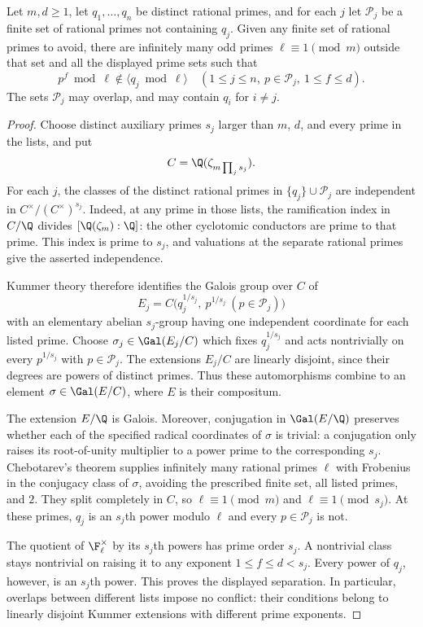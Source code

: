 \begin{lemma}\label{lem:power-separation}
Let $m,d\ge1$, let $q_1,\ldots,q_n$ be distinct rational primes, and for each $j$ let $\mathcal P_j$ be a finite set of rational primes not containing $q_j$. Given any finite set of rational primes to avoid, there are infinitely many odd primes $\ell\equiv1\pmod m$ outside that set and all the displayed prime sets such that
\[
 p^f\bmod\ell\notin\langle q_j\bmod\ell\rangle
 \quad
 (1\le j\le n,\ p\in\mathcal P_j,\ 1\le f\le d).
\]
The sets $\mathcal P_j$ may overlap, and may contain $q_i$ for $i\ne j$.
\end{lemma}
\begin{proof}
Choose distinct auxiliary primes $s_j$ larger than $m$, $d$, and every prime in the lists, and put
\[
 C=\Q(\zeta_{m\prod_j s_j}).
\]
For each $j$, the classes of the distinct rational primes in $\{q_j\}\cup\mathcal P_j$ are independent in $C^\times/(C^\times)^{s_j}$. Indeed, at any prime in those lists, the ramification index in $C/\Q$ divides $[\Q(\zeta_m):\Q]$: the other cyclotomic conductors are prime to that prime. This index is prime to $s_j$, and valuations at the separate rational primes give the asserted independence.

Kummer theory therefore identifies the Galois group over $C$ of
\[
 E_j=C\bigl(q_j^{1/s_j},\ p^{1/s_j}\ (p\in\mathcal P_j)\bigr)
\]
with an elementary abelian $s_j$-group having one independent coordinate for each listed prime. Choose $\sigma_j\in\Gal(E_j/C)$ which fixes $q_j^{1/s_j}$ and acts nontrivially on every $p^{1/s_j}$ with $p\in\mathcal P_j$. The extensions $E_j/C$ are linearly disjoint, since their degrees are powers of distinct primes. Thus these automorphisms combine to an element $\sigma\in\Gal(E/C)$, where $E$ is their compositum.

The extension $E/\Q$ is Galois. Moreover, conjugation in $\Gal(E/\Q)$ preserves whether each of the specified radical coordinates of $\sigma$ is trivial: a conjugation only raises its root-of-unity multiplier to a power prime to the corresponding $s_j$. Chebotarev's theorem supplies infinitely many rational primes $\ell$ with Frobenius in the conjugacy class of $\sigma$, avoiding the prescribed finite set, all listed primes, and $2$. They split completely in $C$, so $\ell\equiv1\pmod m$ and $\ell\equiv1\pmod{s_j}$. At these primes, $q_j$ is an $s_j$th power modulo $\ell$ and every $p\in\mathcal P_j$ is not.

The quotient of $\F_\ell^\times$ by its $s_j$th powers has prime order $s_j$. A nontrivial class stays nontrivial on raising it to any exponent $1\le f\le d<s_j$. Every power of $q_j$, however, is an $s_j$th power. This proves the displayed separation. In particular, overlaps between different lists impose no conflict: their conditions belong to linearly disjoint Kummer extensions with different prime exponents.
\end{proof}

